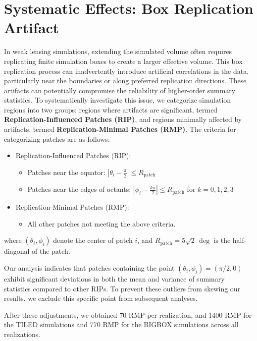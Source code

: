 \clearpage

\section{Systematic Effects: Box Replication Artifact} \label{sec:boxreplication}
In weak lensing simulations, extending the simulated volume often requires replicating finite simulation boxes to create a larger effective volume. This box replication process can inadvertently introduce artificial correlations in the data, particularly near the boundaries or along preferred replication directions. These artifacts can potentially compromise the reliability of higher-order summary statistics. To systematically investigate this issue, we categorize simulation regions into two groups: regions where artifacts are significant, termed \textbf{Replication-Influenced Patches (RIP)}, and regions minimally affected by artifacts, termed \textbf{Replication-Minimal Patches (RMP)}.
The criteria for categorizing patches are as follows:
\begin{itemize} 
    \item Replication-Influenced Patches (RIP):
    \begin{itemize}
        \item Patches near the equator: $ \left| \theta_i - \frac{\pi}{2} \right| \leq R_{\text{patch}} $ 
        \item Patches near the edges of octants: $ \left| \phi_i - \frac{k\pi}{2} \right| \leq R_{\text{patch}} $ for $k = 0, 1, 2, 3$
    \end{itemize}
    \item Replication-Minimal Patches (RMP):
    \begin{itemize}
        \item All other patches not meeting the above criteria.
    \end{itemize}
\end{itemize}
where $(\theta_i, \phi_i)$ denote the center of patch $i$, and $R_{\text{patch}} = 5\sqrt{2}\, \mathrm{\deg}$ is the half-diagonal of the patch.

Our analysis indicates that patches containing the point $(\theta_i, \phi_i) = (\pi/2, 0)$ exhibit significant deviations in both the mean and variance of summary statistics compared to other RIPs. To prevent these outliers from skewing our results, we exclude this specific point from subsequent analyses.

After these adjustments, we obtained $70$ RMP per realization, and $1400$ RMP for the TILED simulations and $770$ RMP for the BIGBOX simulations across all realizations.

